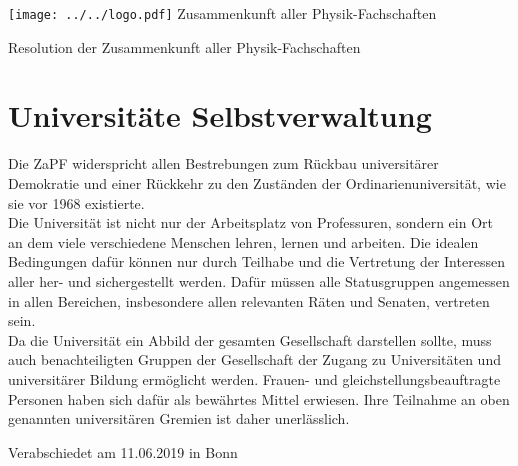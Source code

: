 \documentclass[DIV=calc]{scrartcl}
\begin{document}
    \hspace{0.87\textwidth}
    \begin{minipage}{120pt}
        \vspace{-1.8cm}
        \texttt{[image: ../../logo.pdf]}
        \centering
        \small Zusammenkunft aller Physik-Fachschaften
    \end{minipage}
    \begin{center}
        \huge{Resolution der Zusammenkunft aller Physik-Fachschaften}\vspace{.25\baselineskip}\\
        \normalsize
    \end{center}
    \vspace{1cm}

\section*{Universitäte Selbstverwaltung}

Die ZaPF widerspricht allen Bestrebungen zum Rückbau universitärer Demokratie und einer Rückkehr zu den Zuständen der Ordinarienuniversität, wie sie vor 1968 existierte. \\

Die Universität ist nicht nur der Arbeitsplatz von Professuren, sondern ein Ort an dem viele verschiedene Menschen lehren, lernen und arbeiten. Die idealen Bedingungen dafür können nur durch Teilhabe und die Vertretung der Interessen aller her- und sichergestellt werden. Dafür müssen alle Statusgruppen angemessen in allen Bereichen, insbesondere allen relevanten Räten und Senaten, vertreten sein. \\

Da die Universität ein Abbild der gesamten Gesellschaft darstellen sollte, muss auch benachteiligten Gruppen der Gesellschaft der Zugang zu Universitäten und universitärer Bildung ermöglicht werden. Frauen- und gleichstellungsbeauftragte Personen haben sich dafür als bewährtes Mittel erwiesen. Ihre Teilnahme an oben genannten universitären Gremien ist daher unerlässlich.

\vspace*{\fill}
\begin{flushright}
Verabschiedet am 11.06.2019 in Bonn
\end{flushright}
\end{document}
